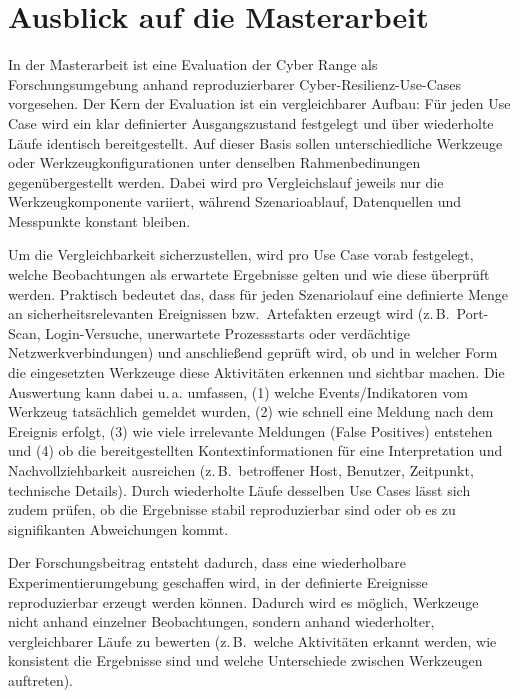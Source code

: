 \chapter{Ausblick auf die Masterarbeit}

In der Masterarbeit ist eine Evaluation der Cyber Range als Forschungsumgebung anhand
reproduzierbarer Cyber-Resilienz-Use-Cases vorgesehen. Der Kern der Evaluation ist ein
vergleichbarer Aufbau: Für jeden Use Case wird ein klar definierter Ausgangszustand
festgelegt und über wiederholte Läufe identisch
bereitgestellt. Auf dieser Basis sollen unterschiedliche Werkzeuge oder Werkzeugkonfigurationen
unter denselben Rahmenbedinungen gegenübergestellt werden. Dabei wird pro Vergleichslauf
jeweils nur die Werkzeugkomponente variiert, während Szenarioablauf, Datenquellen und
Messpunkte konstant bleiben.

Um die Vergleichbarkeit sicherzustellen, wird pro Use Case vorab festgelegt, welche
Beobachtungen als erwartete Ergebnisse gelten und wie diese überprüft werden.
Praktisch bedeutet das, dass für jeden Szenariolauf eine definierte Menge an
sicherheitsrelevanten Ereignissen bzw.\ Artefakten erzeugt wird (z.\,B.\ Port-Scan, Login-Versuche,
unerwartete Prozessstarts oder verdächtige Netzwerkverbindungen) und anschließend geprüft wird,
ob und in welcher Form die eingesetzten Werkzeuge diese Aktivitäten erkennen und sichtbar machen.
Die Auswertung kann dabei u.\,a. umfassen, (1) welche Events/Indikatoren vom Werkzeug tatsächlich
gemeldet wurden, (2) wie schnell eine Meldung nach dem Ereignis erfolgt, (3) wie viele irrelevante
Meldungen (False Positives) entstehen und (4) ob die bereitgestellten Kontextinformationen
für eine Interpretation und Nachvollziehbarkeit ausreichen (z.\,B.\ betroffener Host, Benutzer,
Zeitpunkt, technische Details). Durch wiederholte Läufe desselben Use Cases lässt sich zudem prüfen,
ob die Ergebnisse stabil reproduzierbar sind oder ob es zu signifikanten Abweichungen kommt.


Der Forschungsbeitrag entsteht dadurch, dass eine wiederholbare Experimentierumgebung geschaffen wird,
in der definierte Ereignisse reproduzierbar erzeugt werden können. Dadurch wird es möglich, Werkzeuge
nicht anhand einzelner Beobachtungen, sondern anhand wiederholter, vergleichbarer Läufe zu bewerten
(z.\,B.\ welche Aktivitäten erkannt werden, wie konsistent die Ergebnisse sind und welche Unterschiede
zwischen Werkzeugen auftreten).

